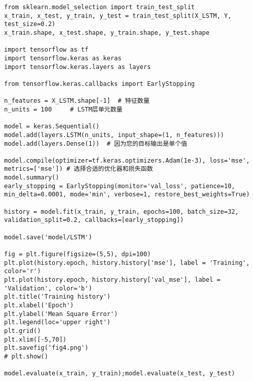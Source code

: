 \begin{lstlisting}
from sklearn.model_selection import train_test_split
x_train, x_test, y_train, y_test = train_test_split(X_LSTM, Y, test_size=0.2)
x_train.shape, x_test.shape, y_train.shape, y_test.shape

import tensorflow as tf
import tensorflow.keras as keras
import tensorflow.keras.layers as layers

from tensorflow.keras.callbacks import EarlyStopping

n_features = X_LSTM.shape[-1]  # 特征数量
n_units = 100     # LSTM层单元数量

model = keras.Sequential()
model.add(layers.LSTM(n_units, input_shape=(1, n_features)))
model.add(layers.Dense(1))  # 因为您的目标输出是单个值

model.compile(optimizer=tf.keras.optimizers.Adam(1e-3), loss='mse', metrics=['mse']) # 选择合适的优化器和损失函数
model.summary()
early_stopping = EarlyStopping(monitor='val_loss', patience=10, min_delta=0.0001, mode='min', verbose=1, restore_best_weights=True)

history = model.fit(x_train, y_train, epochs=100, batch_size=32, validation_split=0.2, callbacks=[early_stopping])

model.save('model/LSTM')

fig = plt.figure(figsize=(5,5), dpi=100)
plt.plot(history.epoch, history.history['mse'], label = 'Training', color='r')
plt.plot(history.epoch, history.history['val_mse'], label = 'Validation', color='b')
plt.title('Training history')
plt.xlabel('Epoch')
plt.ylabel('Mean Square Error')
plt.legend(loc='upper right')
plt.grid()
plt.xlim([-5,70])
plt.savefig('fig4.png')
# plt.show()

model.evaluate(x_train, y_train);model.evaluate(x_test, y_test)
\end{lstlisting}

